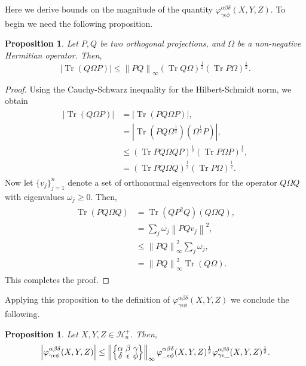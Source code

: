 \documentclass[pdflatex, sn-mathphys-num]{sn-jnl} %
\theoremstyle{plain}
\newtheorem{prop}[thm]{Proposition}
\theoremstyle{definition}
\DeclareMathOperator{\Tr}{Tr}
\newcommand{\norm}[1]{\left\lVert#1\right\rVert}
\newcommand{\abs}[1]{\left|#1\right|}
\newcommand{\hermp}[1]{\mathcal H^{+}_{#1}}
\newcommand{\vp}{\varphi} %
\newcommand{\ya}{\alpha}
\newcommand{\yb}{\beta}
\newcommand{\yc}{\gamma}
\newcommand{\yd}{\delta}
\newcommand{\ye}{\epsilon}
\newcommand{\yf}{\phi}
\newcommand{\tightcurlysixj}[1]{
\begingroup
\arraycolsep=1.5pt
\renewcommand{\arraystretch}{0.3}
\left\{\!\begin{array}{ccc}
    #1
\end{array}\!\right\}
\endgroup
}
\newcommand{\abcdefsymbol}{\tightcurlysixj{\alpha & \beta & \gamma \\ \delta & \epsilon & \phi}}
\begin{document}
Here we derive bounds on the magnitude of the quantity $\vp^{\ya \yb \yd}_{\yc \ye \yf}(X, Y, Z)$.
To begin we need the following proposition.
\begin{prop}\label{prop:cauchy_schwarz_ineq_double_proj}
    Let $P, Q$ be two orthogonal projections, and $\Omega$ be a non-negative Hermitian operator.
    Then,
    \begin{equation}
        \label{eq:cauchy_schwarz_ineq_double_proj}
        \abs{\Tr(Q \Omega P)} \leq \norm{PQ}_{\infty} (\Tr Q\Omega)^{\frac{1}{2}}(\Tr P\Omega )^{\frac{1}{2}}.
    \end{equation}
\end{prop}
\begin{proof}
    Using the Cauchy-Schwarz inequality for the Hilbert-Schmidt norm, we obtain
    \begin{align}
        \begin{split}
            \abs{\Tr(Q \Omega P)}
            &= \abs{\Tr(P Q \Omega P)}, \\
            &= \abs{\Tr(P Q \Omega^{\frac{1}{2}}) (\Omega^{\frac{1}{2}} P)}, \\
            &\leq (\Tr P Q \Omega Q P)^{\frac{1}{2}} (\Tr P \Omega P)^{\frac{1}{2}}, \\
            &= (\Tr P Q \Omega Q)^{\frac{1}{2}} (\Tr P \Omega)^{\frac{1}{2}}.
        \end{split}
    \end{align}
    Now let $\{ v_j \}_{j=1}^{n}$ denote a set of orthonormal eigenvectors for the operator $Q \Omega Q$ with eigenvalues $\omega_j \geq 0$.
    Then,
    \begin{align}
        \begin{split}
            \Tr(P Q \Omega Q)
            &= \Tr (Q P^2 Q)(Q \Omega Q), \\
            &= \sum_j \omega_j \norm{P Q v_j}^2, \\
            &\leq \norm{P Q}_\infty^2  \sum_{j} \omega_j, \\
            &= \norm{P Q}_\infty^2 \Tr(Q \Omega).
        \end{split}
    \end{align}
    This completes the proof.
\end{proof}
Applying this proposition to the definition of $\vp^{\ya\yb\yd}_{\yc\ye\yf}(X,Y,Z)$ we conclude the following.
\begin{prop}
    \label{prop:varphi_tet_main_ineq}
    Let $X,Y,Z \in \hermp{n}$. Then,
    \begin{equation}
        \abs{\vp^{\ya\yb\yd}_{\yc\ye\yf}(X,Y,Z)} \leq \norm{\abcdefsymbol}_{\infty} \vp^{\ya\yb\yd}_{\_\ye\yf}(X,Y,Z)^{\frac{1}{2}} \vp^{\ya\yb\yd}_{\yc\ye\_}(X,Y,Z)^{\frac{1}{2}}.
    \end{equation}
\end{prop}
\end{document}
